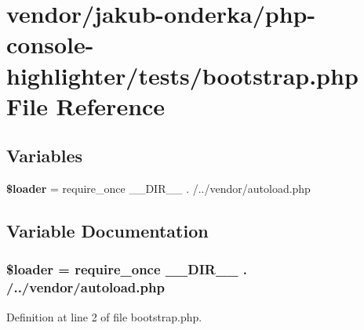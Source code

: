 \section{vendor/jakub-\/onderka/php-\/console-\/highlighter/tests/bootstrap.php File Reference}
\label{jakub-onderka_2php-console-highlighter_2tests_2bootstrap_8php}
\subsection*{Variables}
\begin{DoxyCompactItemize}
\item 
{\bf \$loader} = require\+\_\+once \+\_\+\+\_\+\+D\+I\+R\+\_\+\+\_\+ . \textquotesingle{}/../vendor/autoload.\+php\textquotesingle{}
\end{DoxyCompactItemize}


\subsection{Variable Documentation}
\subsubsection[{\$loader}]{\setlength{\rightskip}{0pt plus 5cm}\$loader = require\+\_\+once \+\_\+\+\_\+\+D\+I\+R\+\_\+\+\_\+ . \textquotesingle{}/../vendor/autoload.\+php\textquotesingle{}}\label{jakub-onderka_2php-console-highlighter_2tests_2bootstrap_8php_ab832f4c463ee1c9ba2e9464265f7ea3b}


Definition at line 2 of file bootstrap.\+php.

